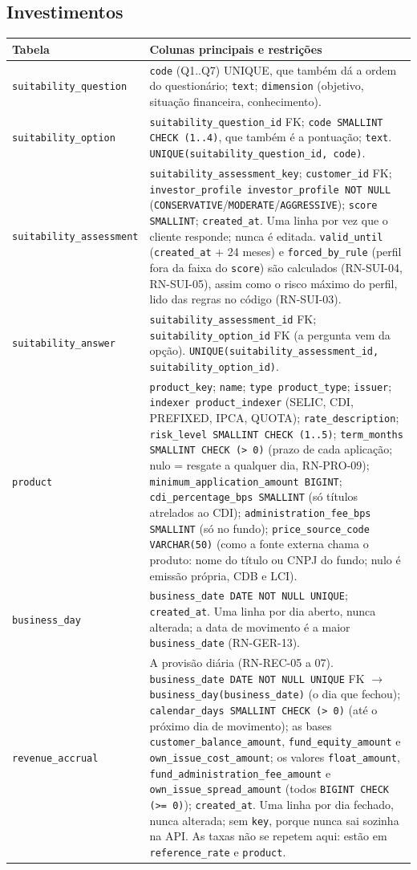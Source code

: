 \documentclass[11pt,a4paper]{article}
\newcommand{\tb}[1]{\texttt{#1}}           %
\begin{document}
\subsection{Investimentos}

\begin{longtable}{@{}P{3.9cm}P{12.2cm}@{}}
\toprule
\textbf{Tabela} & \textbf{Colunas principais e restrições} \\
\midrule
\endhead
\tb{suitability_question} & \tb{code} (Q1..Q7) UNIQUE, que também dá a ordem do questionário; \tb{text}; \tb{dimension} (objetivo, situação financeira, conhecimento). \\
\tb{suitability_option} & \tb{suitability_question_id} FK; \tb{code SMALLINT CHECK (1..4)}, que também é a pontuação; \tb{text}. \tb{UNIQUE(suitability_question_id, code)}. \\
\tb{suitability_assessment} & \tb{suitability_assessment_key}; \tb{customer_id} FK; \tb{investor_profile investor_profile NOT NULL} (\tb{CONSERVATIVE}/\tb{MODERATE}/\tb{AGGRESSIVE}); \tb{score SMALLINT}; \tb{created_at}. Uma linha por vez que o cliente responde; nunca é editada. \tb{valid_until} (\tb{created_at} + 24 meses) e \tb{forced_by_rule} (perfil fora da faixa do \tb{score}) são calculados (RN-SUI-04, RN-SUI-05), assim como o risco máximo do perfil, lido das regras no código (RN-SUI-03). \\
\tb{suitability_answer} & \tb{suitability_assessment_id} FK; \tb{suitability_option_id} FK (a pergunta vem da opção). \tb{UNIQUE(suitability_assessment_id, suitability_option_id)}. \\
\tb{product} & \tb{product_key}; \tb{name}; \tb{type product_type}; \tb{issuer}; \tb{indexer product_indexer} (SELIC, CDI, PREFIXED, IPCA, QUOTA); \tb{rate_description}; \tb{risk_level SMALLINT CHECK (1..5)}; \tb{term_months SMALLINT CHECK (> 0)} (prazo de cada aplicação; nulo = resgate a qualquer dia, RN-PRO-09); \tb{minimum_application_amount BIGINT}; \tb{cdi_percentage_bps SMALLINT} (só títulos atrelados ao CDI); \tb{administration_fee_bps SMALLINT} (só no fundo); \tb{price_source_code VARCHAR(50)} (como a fonte externa chama o produto: nome do título ou CNPJ do fundo; nulo é emissão própria, CDB e LCI). \\
\tb{business_day} & \tb{business_date DATE NOT NULL UNIQUE}; \tb{created_at}. Uma linha por dia aberto, nunca alterada; a data de movimento é a maior \tb{business_date} (RN-GER-13). \\
\tb{revenue_accrual} & A provisão diária (RN-REC-05 a 07). \tb{business_date DATE NOT NULL UNIQUE} FK $\to$ \tb{business_day(business_date)} (o dia que fechou); \tb{calendar_days SMALLINT CHECK (> 0)} (até o próximo dia de movimento); as bases \tb{customer_balance_amount}, \tb{fund_equity_amount} e \tb{own_issue_cost_amount}; os valores \tb{float_amount}, \tb{fund_administration_fee_amount} e \tb{own_issue_spread_amount} (todos \tb{BIGINT CHECK (>= 0)}); \tb{created_at}. Uma linha por dia fechado, nunca alterada; sem \tb{key}, porque nunca sai sozinha na API. As taxas não se repetem aqui: estão em \tb{reference_rate} e \tb{product}. \\

\end{longtable}
\end{document}
